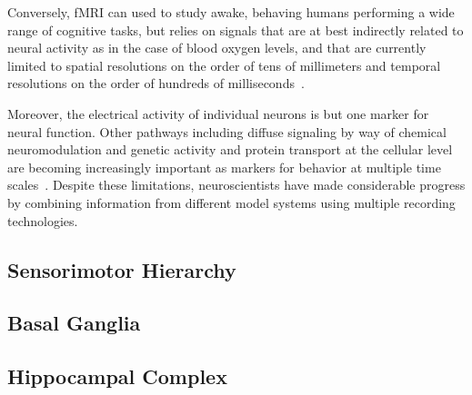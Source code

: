 Conversely, fMRI can used to study awake, behaving humans performing a wide range of cognitive tasks, but relies on signals that are at best indirectly related to neural activity as in the case of blood oxygen levels, and that are currently limited to spatial resolutions on the order of tens of millimeters and temporal resolutions on the order of hundreds of milliseconds~\cite{GoenseetalFiCN-16,GloverPMC-11,BuxtonetalNEUROIMAGING-04}.

Moreover, the electrical activity of individual neurons is but one marker for neural function. Other pathways including diffuse signaling by way of chemical neuromodulation and genetic activity and protein transport at the cellular level are becoming increasingly important as markers for behavior at multiple time scales~\cite{WangandWangFiP-19}. Despite these limitations, neuroscientists have made considerable progress by combining information from different model systems using multiple recording technologies.


\subsection{Sensorimotor Hierarchy}
\label{subsection_sensorimotor_hierarchy}



\subsection{Basal Ganglia}
\label{subsection_basal_ganlia}



\subsection{Hippocampal Complex}
\label{subsection_hippocampus}



 

